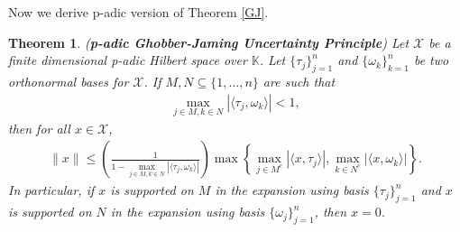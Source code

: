 \documentclass{amsart}
\newtheorem{theorem}{Theorem}[section]
\begin{document}
Now we derive p-adic version of Theorem  \ref{GJ}.
\begin{theorem}(\textbf{p-adic Ghobber-Jaming  Uncertainty Principle})
	Let $\mathcal{X}$  be a finite dimensional  p-adic Hilbert  space over $\mathbb{K}$. 	Let $\{\tau_j\}_{j=1}^n$ and $\{\omega_k\}_{k=1}^n$ be  two orthonormal bases  for  $\mathcal{X}$. If $M,N\subseteq \{1, \dots, n\}$ are such that 
	\begin{align*}
	\displaystyle \max_{j \in M, k \in N}|\langle \tau_j, \omega_k \rangle|<1,
	\end{align*}
then for all $x \in \mathcal{X}$, 	
\begin{align}\label{PGJ}
		\|x\|\leq  \left(\frac{1}{1-\displaystyle \max_{j \in M, k \in N}|\langle \tau_j, \omega_k \rangle|}\right)\max\left\{\displaystyle \max_{j \in M^c}|\langle x, \tau_j\rangle |, \displaystyle \max_{k \in N^c}|\langle x, \omega_k\rangle |\right\}.
\end{align}
In particular, if $x$ is supported on $M$ in the expansion using basis $\{\tau_j\}_{j=1}^n$ and $x$ is supported on $N$ in the expansion using basis $\{\omega_j\}_{j=1}^n$, then $x=0$. 
\end{theorem}
\end{document}
